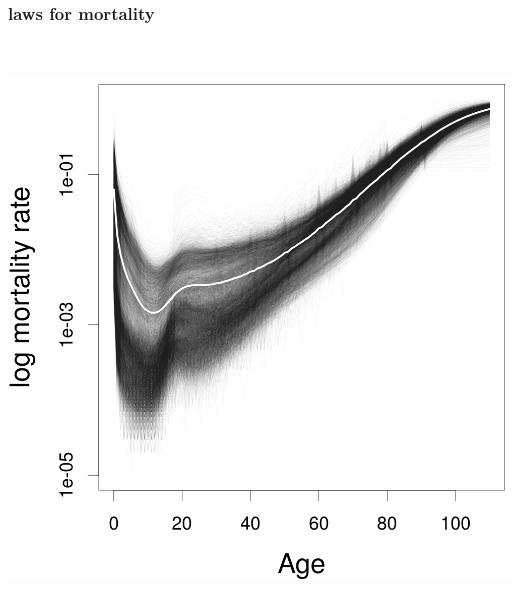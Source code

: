 \documentclass[20pt]{beamer}
\begin{document}
\begin{frame}
\frametitle{laws for mortality}
\vspace{-1em}
\begin{center}
\includegraphics[height=6in]{Figures/Mortality2.png}
\end{center}
\end{frame}
\end{document}

